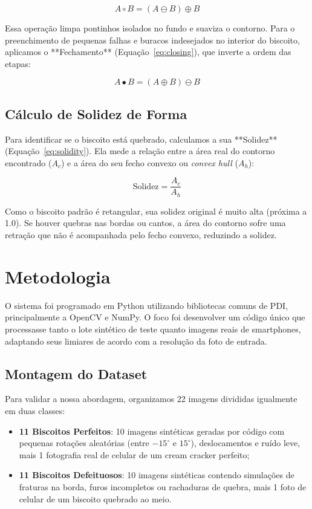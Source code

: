 \documentclass[12pt]{article}
\begin{document}
\begin{equation}
A \circ B = (A \ominus B) \oplus B
\label{eq:opening}
\end{equation}

Essa operação limpa pontinhos isolados no fundo e suaviza o contorno. Para o preenchimento de pequenas falhas e buracos indesejados no interior do biscoito, aplicamos o **Fechamento** (Equação~\ref{eq:closing}), que inverte a ordem das etapas:

\begin{equation}
A \bullet B = (A \oplus B) \ominus B
\label{eq:closing}
\end{equation}

\subsection{Cálculo de Solidez de Forma}

Para identificar se o biscoito está quebrado, calculamos a sua **Solidez** (Equação~\ref{eq:solidity}). Ela mede a relação entre a área real do contorno encontrado ($A_c$) e a área do seu fecho convexo ou \textit{convex hull} ($A_h$):

\begin{equation}
\text{Solidez} = \frac{A_c}{A_h}
\label{eq:solidity}
\end{equation}

Como o biscoito padrão é retangular, sua solidez original é muito alta (próxima a 1.0). Se houver quebras nas bordas ou cantos, a área do contorno sofre uma retração que não é acompanhada pelo fecho convexo, reduzindo a solidez.

\section{Metodologia}

O sistema foi programado em Python utilizando bibliotecas comuns de PDI, principalmente a OpenCV e NumPy. O foco foi desenvolver um código único que processasse tanto o lote sintético de teste quanto imagens reais de smartphones, adaptando seus limiares de acordo com a resolução da foto de entrada.

\subsection{Montagem do Dataset}

Para validar a nossa abordagem, organizamos 22 imagens divididas igualmente em duas classes:
\begin{itemize}
    \item \textbf{11 Biscoitos Perfeitos}: 10 imagens sintéticas geradas por código com pequenas rotações aleatórias (entre $-15^\circ$ e $15^\circ$), deslocamentos e ruído leve, mais 1 fotografia real de celular de um cream cracker perfeito;
    \item \textbf{11 Biscoitos Defeituosos}: 10 imagens sintéticas contendo simulações de fraturas na borda, furos incompletos ou rachaduras de quebra, mais 1 foto de celular de um biscoito quebrado ao meio.
\end{itemize}
\end{document}
